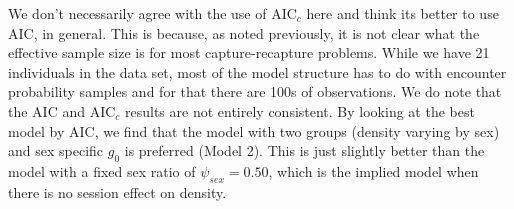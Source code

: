 We don't necessarily agree with the use of AIC$_c$ here and think its
better to use AIC, in general. This is because, as noted previously,
it is not clear what the
effective sample size is for most capture-recapture problems. While we
have 21 individuals in the data set, most of the model structure has
to do with encounter probability samples and for that there are 100s
of observations. We do note that the AIC and AIC$_c$ results are not
entirely consistent.  By looking at the best model by AIC, we find
that the model with two groups (density varying by sex) and sex specific $g_{0}$ is
preferred (Model 2). This is just slightly better than the model with
a fixed sex ratio of $\psi_{sex} = 0.50$, which is the implied model
when there is no session effect on density.

